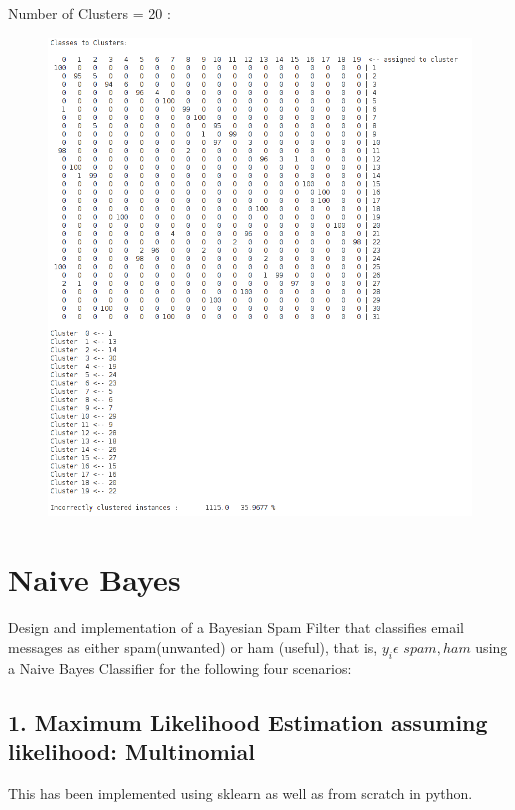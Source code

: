 \documentclass[paper=a4, fontsize=11pt]{scrartcl}
\numberwithin{equation}{section}		%
\numberwithin{figure}{section}			%
\numberwithin{table}{section}				%
\begin{document}
Number of Clusters = 20 :
\begin{figure}[H]
	\centering
  \includegraphics[width=1.2\textwidth]{6db7}
\end{figure}


\newpage
\section*{Naive Bayes}
Design and implementation of a Bayesian Spam Filter that classifies email messages as either spam(unwanted) or ham (useful), that is, $y_{i} \epsilon$ ${spam, ham}$ using a Naive Bayes Classifier for the following four scenarios:

\subsection*{1. Maximum Likelihood Estimation assuming likelihood: Multinomial}
This has been implemented using sklearn as well as from scratch in python.
\end{document}
